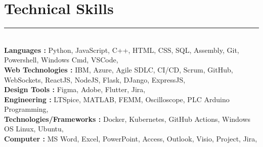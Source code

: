 \documentclass[12pt]{article}
\begin{document}
\vspace{-3mm}\section*{\fontsize{14}{1}\selectfont\color{color_29791}Technical Skills}\vspace{-9pt} 
\rule{\textwidth}{0.4pt}
\vspace{2pt}
\\{\fontsize{9}{1}\selectfont\color{color_29791}\hspace{5mm}\textbf{Languages :} Python, JavaScript, C++, HTML, CSS, SQL, Assembly, Git, Powershell, Windows Cmd, VSCode,}
\\{\fontsize{9}{1}\selectfont\color{color_29791}\hspace{5mm}\textbf{Web Technologies :} IBM, Azure, Agile SDLC, CI/CD, Scrum, GitHub, WebSockets, ReactJS, NodeJS, Flask, DJango, ExpressJS,}
\\{\fontsize{9}{1}\selectfont\color{color_29791}\hspace{5mm}\textbf{Design Tools :} Figma, Adobe, Flutter, Jira,}
\\{\fontsize{9}{1}\selectfont\color{color_29791}\hspace{5mm}\textbf{Engineering :} LTSpice, MATLAB, FEMM, Oscilloscope, PLC Arduino Programming,}
\\{\fontsize{9}{1}\selectfont\color{color_29791}\hspace{5mm}\textbf{Technologies/Frameworks :} Docker, Kubernetes, GitHub Actions, Windows OS Linux, Ubuntu,}
\\{\fontsize{9}{1}\selectfont\color{color_29791}\hspace{5mm}\textbf{Computer :} MS Word, Excel, PowerPoint, Access, Outlook, Visio, Project, Jira,}
\end{document}
